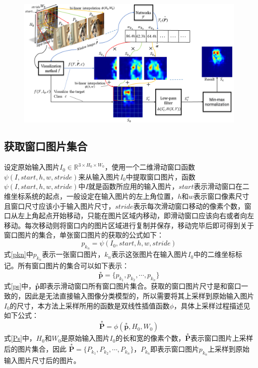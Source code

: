 \begin{figure}[h]
	\centering 
	\includegraphics[width=15cm]{fig/ch4/pipeline.png}
	\label{fig:pipeline}
\end{figure}

\subsection{获取窗口图片集合}
设定原始输入图片$I_0 \in \mathbb{R}^{3\times H_0 \times W_0}$，使用一个二维滑动窗口函数$\psi(I, start, h, w, stride)$来从输入图片$I_0$中提取窗口图片，函数$\psi(I, start, h, w, stride)$中$I$就是函数所应用的输入图片，$start$表示滑动窗口在二维坐标系统的起点，一般设定在输入图片的左上角位置，$h$和$w$表示窗口像素尺寸且窗口尺寸应该小于输入图片尺寸，$stride$表示每次滑动窗口移动的像素个数，窗口从左上角起点开始移动，只能在图片区域内移动，即滑动窗口应该向右或者向左移动。每次移动则将窗口内的图片区域进行复制并保存，移动完毕后即可得到关于窗口图片的集合，单张窗口图片的获取的公式如下：
\begin{equation}
	p_{k_n}=\psi(I_0,start,h,w,stride)
	\label{pkn}
\end{equation}
式\ref{pkn}中$p_{k_n}$表示一张窗口图片，$k_n$表示这张图片在输入图片$I_0$中的二维坐标标记。所有窗口图片的集合可以如下表示：
\begin{equation}
	\overset{*}{\bm{p}}=\{p_{k_1},p_{k_2},\cdots,p_{k_n}\}
\label{ps}
\end{equation}
式\ref{ps}中，$\overset{*}{\bm{p}}$即表示滑动窗口所有窗口图片集合。获取的窗口图片尺寸是和窗口一致的，因此是无法直接输入图像分类模型的，所以需要将其上采样到原始输入图片$I_0$的尺寸，本方法上采样所用的函数是双线性插值函数$\phi$，具体上采样过程描述见如下公式：
\begin{equation}
	\overset{*}{\bm{P}}=\phi(\overset{*}{\bm{p}},H_0,W_0) 
\label{Ps}
\end{equation}
式\ref{Ps}中，$H_0$和$W_0$是原始输入图片$I_0$的长和宽的像素个数，$\overset{*}{\bm{P}}$表示窗口图片上采样后的图片集合，因此 $\overset{*}{\bm{P}}=\{P_{k_1},P_{k_2},\cdots,P_{k_n}\}$，$P_{k_n}$即表示窗口图片$p_{k_n}$上采样到原始输入图片尺寸后的图片。

